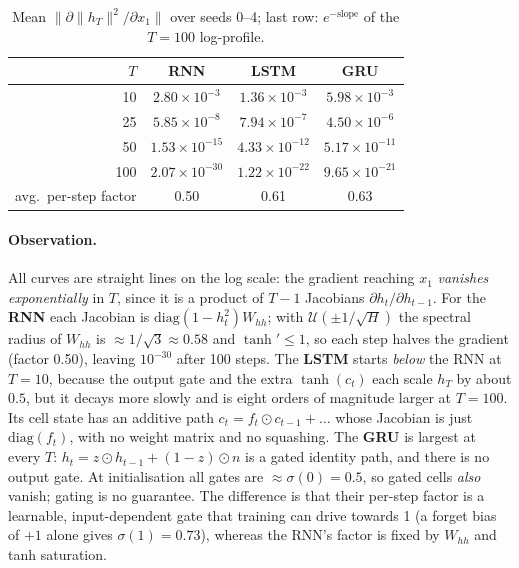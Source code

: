 \documentclass[10pt,a4paper]{article}
\begin{document}
\begin{table}[H]
\centering\small
\begin{tabular}{rccc}
\toprule
$T$ & RNN & LSTM & GRU \\
\midrule
10  & $2.80\times10^{-3}$ & $1.36\times10^{-3}$ & $5.98\times10^{-3}$ \\
25  & $5.85\times10^{-8}$ & $7.94\times10^{-7}$ & $4.50\times10^{-6}$ \\
50  & $1.53\times10^{-15}$ & $4.33\times10^{-12}$ & $5.17\times10^{-11}$ \\
100 & $2.07\times10^{-30}$ & $1.22\times10^{-22}$ & $9.65\times10^{-21}$ \\
\midrule
avg.\ per-step factor & 0.50 & 0.61 & 0.63 \\
\bottomrule
\end{tabular}
\caption{Mean $\|\partial\|h_T\|^2/\partial x_1\|$ over seeds 0--4; last row: $e^{-\text{slope}}$ of the
$T=100$ log-profile.}
\label{tab:grad}
\end{table}

\paragraph{Observation.} All curves are straight lines on the log scale: the gradient reaching $x_1$
\emph{vanishes exponentially} in $T$, since it is a product of $T-1$ Jacobians
$\partial h_t/\partial h_{t-1}$. For the \textbf{RNN} each Jacobian is $\mathrm{diag}(1-h_t^2)W_{hh}$; with
$\mathcal U(\pm1/\sqrt H)$ the spectral radius of $W_{hh}$ is $\approx1/\sqrt3\approx0.58$ and $\tanh'\le1$,
so each step halves the gradient (factor 0.50), leaving $10^{-30}$ after 100 steps. The \textbf{LSTM} starts
\emph{below} the RNN at $T=10$, because the output gate and the extra $\tanh(c_t)$ each scale $h_T$ by about
$0.5$, but it decays more slowly and is eight orders of magnitude larger at $T=100$. Its cell state has an
additive path $c_t=f_t\odot c_{t-1}+\dots$ whose Jacobian is just $\mathrm{diag}(f_t)$, with no weight matrix
and no squashing. The \textbf{GRU} is largest at every $T$: $h_t=z\odot h_{t-1}+(1-z)\odot n$ is a gated
identity path, and there is no output gate. At initialisation all gates are $\approx\sigma(0)=0.5$, so gated
cells \emph{also} vanish; gating is no guarantee. The difference is that their per-step factor is a learnable,
input-dependent gate that training can drive towards 1 (a forget bias of $+1$ alone gives $\sigma(1)=0.73$),
whereas the RNN's factor is fixed by $W_{hh}$ and tanh saturation.
\end{document}
